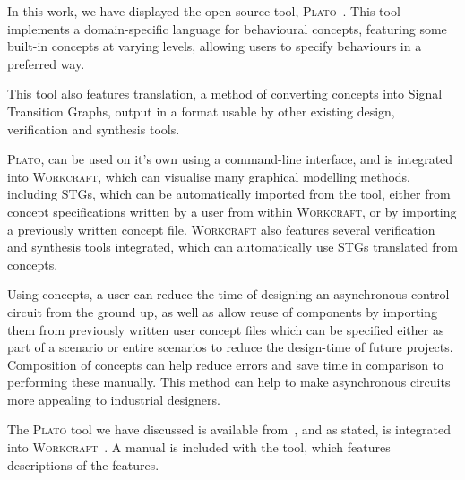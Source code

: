 \documentclass[british,conference,compsoc]{IEEEtran}
\newcommand{\noun}[1]{\textsc{#1}}
\begin{document}
\vspace{-3mm}

In this work, we have displayed the open-source
tool, \noun{Plato}~\cite{2016_concepts_github}. This tool implements a 
domain-specific language for behavioural concepts, featuring some built-in 
concepts at varying levels, allowing users to specify behaviours in a preferred 
way. 

This tool also features translation, a method of converting concepts into Signal
Transition Graphs, output in a format usable by other existing design, 
verification and synthesis tools. 

\noun{Plato}, can be used on it's own using a command-line interface, and is
integrated into \noun{Workcraft}, which can visualise many graphical modelling
methods, including STGs, which can be automatically imported from the
tool, either from concept specifications written by a user from within 
\noun{Workcraft}, or by importing a previously written concept file.
\noun{Workcraft} also features several verification and synthesis tools 
integrated, which can automatically use STGs translated from concepts. 

Using concepts, a user can reduce the time of designing an asynchronous
control circuit from the ground up, as well as allow reuse of components
by importing them from previously written user concept files which can be 
specified either as part of a scenario or entire scenarios to reduce the 
design-time of future projects. Composition of concepts can help
reduce errors and save time in comparison to performing these manually.
This method can help to make asynchronous circuits more appealing
to industrial designers.


The \noun{Plato} tool we have discussed is available 
from~\cite{2016_concepts_github}, and as stated, is integrated into 
\noun{Workcraft}~\cite{Workcraft_website}. A manual is included with the tool, 
which features descriptions of the features. 



\end{document}
